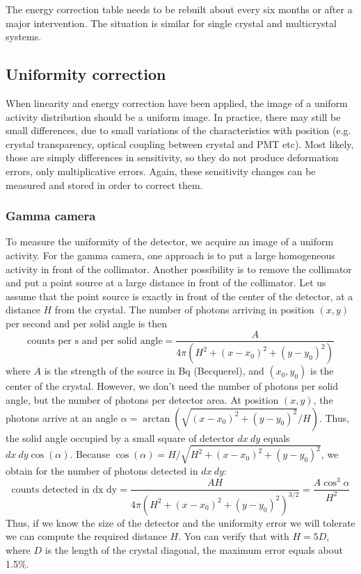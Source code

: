The energy correction table needs to be rebuilt about every six months or
after a major intervention. The situation is similar for single crystal and
multicrystal systems.


\subsection{Uniformity correction}
When linearity and energy correction have been applied, the image of a uniform
activity distribution should be a uniform image. In practice, there may still
be small differences, due to small variations of the characteristics with
position (e.g. crystal transparency, optical coupling between crystal and PMT
etc). Most likely, those are simply differences in sensitivity, so they do not
produce deformation errors, only multiplicative errors. Again, these
sensitivity changes can be measured and stored in order to correct them.

\subsubsection{Gamma camera}
To measure the uniformity of the detector, we acquire an image of
a uniform activity. For the gamma camera, one approach is to put a
large homogeneous activity in front of the collimator. Another
possibility is to remove the collimator and put a point source at a
large distance in front of the collimator. Let us assume that the
point source is exactly in front of the center of the detector, at a
distance $H$ from the crystal. The number of photons arriving in
position $(x,y)$ per second and per solid angle is then
\begin{equation}
  \mbox{counts  per s and per solid angle} 
     = \frac{A}{4 \pi (H^2 + (x-x_0)^2 +(y-y_0)^2)}
\end{equation}
where $A$ is the strength of the source in Bq (Becquerel), and $(x_0, y_0)$ is
the center of the crystal. However, we don't need the number of
photons per solid angle, but the number of photons per detector
area. At position $(x,y)$, the photons arrive at an angle 
$\alpha = \arctan(\sqrt{(x-x_0)^2 +(y-y_0)^2}/ H)$. Thus, the solid
angle occupied by a small square of detector $dx\ dy$ equals $dx\ dy
\cos(\alpha)$. Because $\cos(\alpha) = H / \sqrt{H^2 + (x-x_0)^2
  +(y-y_0)^2}$, we obtain for the number of photons detected in $dx\
dy$:
\begin{equation}
  \mbox{counts detected in dx dy} 
     = \frac{A H}{4 \pi (H^2 + (x-x_0)^2 +(y-y_0)^2)^{3/2}}
     = \frac{A \cos^3\alpha}{H^2}
\end{equation}
%
Thus, if we know the size of the detector and the uniformity error we
will tolerate we can compute the required distance $H$.  You can
verify that with $H = 5 D$, where $D$ is the length of the crystal diagonal,
the maximum error equals about 1.5\%.

